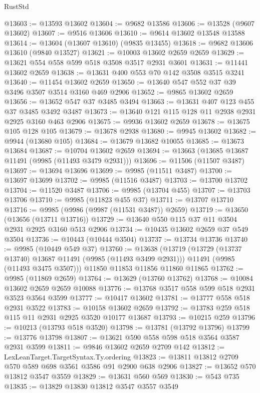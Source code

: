 \begin{lexlean}{RustStd}
\begin{coremodule}
@13603 := @13593 @13602
@13604 := @9682 @13586
@13606 := @13528 (@9607 @13602)
@13607 := @9516 @13606
@13610 := @9614 @13602 @13548 @13588
@13614 := @13604 (@13607 @13610) (@9835 @13455)
@13618 := @9682 @13606 @13610 (@9840 @13527)
@13621 := @10003 @13602 @2659 @2659
@13629 := @13621 @554 @558 @599 @518 @3508 @3517 @2931 @3601
@13631 := @11441 @13602 @2659
@13638 := @13631 @400 @553 @70 @142 @3508 @3515 @3241
@13640 := @11454 @13602 @2659
@13650 := @13640 @547 @552 @37 @39 @3496 @3507 @3514 @3160 @469 @2906
@13652 := @9865 @13602 @2659
@13656 := @13652 @547 @37 @3485 @3494
@13663 := @13631 @407 @123 @455 @37 @3485 @3492 @3487
@13673 := @13640 @121 @115 @128 @11 @2938 @2931 @2925 @3160 @463 @2906
@13675 := @9936 @13602 @2659
@13678 := @13675 @105 @128 @105
@13679 := @13678 @2938
@13680 := @9945 @13602
@13682 := @9944 (@13680 @105)
@13684 := @13679 @13682 @10055
@13685 := @13673 @13684
@13687 := @10704 @13602 @2659
@13694 := @13663 (@13685 @13687 @11491 (@9985 (@11493 @3479 @2931)))
@13696 := @11506 (@11507 @3487)
@13697 := @13694 @13696
@13699 := @9985 (@11511 @3487)
@13700 := @13697 @13699
@13702 := @9985 (@11516 @3487)
@13703 := @13700 @13702
@13704 := @11520 @3487
@13706 := @9985 (@13704 @455)
@13707 := @13703 @13706
@13710 := @9985 (@11823 @455 @37)
@13711 := @13707 @13710
@13716 := @9985 (@9986 (@9987 (@11531 @3487)) @2659)
@13719 := @13650 (@13656 (@13711 @13716))
@13729 := @13640 @550 @115 @37 @11 @3504 @2931 @2925 @3160 @513 @2906
@13734 := @10435 @13602 @2659 @37 @549 @3504
@13736 := @10443 (@10444 @3504)
@13737 := @13734 @13736
@13740 := @9985 (@10449 @549 @37)
@13760 := @13638
    (@13719
      (@13729 (@13737 @13740) @13687 @11491 (@9985 (@11493 @3499 @2931)))
      @11491
      (@9985 (@11493 @3475 @3507)))
    @11850
    @11853
    @11856
    @11860
    @11865
@13762 := @9985 (@11869 @2659)
@13764 := @13629 (@13760 @13762)
@13768 := @10084 @13602 @2659 @2659 @10088
@13776 := @13768 @3517 @558 @599 @518 @2931 @3523 @3564 @3599
@13777 := @10417 @13602
@13781 := @13777 @558 @518 @2931 @3522
@13783 := @10158 @13602 @2659
@13792 := @13783 @259 @518 @115 @11 @2931 @2925 @3520 @10177 @13687
@13793 := @10215 @259
@13796 := @10213 (@13793 @518 @3520)
@13798 := @13781 (@13792 @13796)
@13799 := @13776 @13798
@13807 := @13621 @590 @558 @598 @518 @3564 @3587 @2931 @3599
@13811 := @9846 @13602 @2659 @2709 @142
@13812 := LexLeanTarget.TargetSyntax.Ty.ordering
@13823 := @13811 @13812 @2709 @570 @589 @698 @3561 @3586 @91 @2900 @638 @2906
@13827 := @13652 @570 @13812 @3547 @3559
@13829 := @13631 @560 @569
@13830 := @543 @735
@13835 := @13829 @13830 @13812 @3547 @3557 @3549

\end{coremodule}
\end{lexlean}
